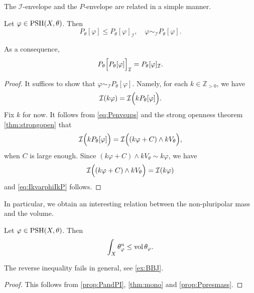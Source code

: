 The $\mathcal{I}$-envelope and the $P$-envelope are related in a simple manner.
\begin{proposition}\label{prop:PandPI}
    Let $\varphi\in \mathrm{PSH}(X,\theta)$. Then
    \[
        P_{\theta}[\varphi]\leq P_{\theta}[\varphi]_{\mathcal{I}},\quad \varphi \sim_{\mathcal{I}}P_{\theta}[\varphi].
    \]
\end{proposition}
As a consequence,
\begin{equation}\label{eq:PthetaIP_comp}
    P_{\theta}\Bigl[P_{\theta}[\varphi]\Bigr]_{\mathcal{I}}=P_{\theta}[\varphi]_{\mathcal{I}}.
\end{equation}
\begin{proof}
    It suffices to show that $\varphi\sim_{\mathcal{I}} P_{\theta}[\varphi]$. Namely, for each $k\in \mathbb{Z}_{>0}$, we have
    \begin{equation}\label{eq:IkvarphiIkP}
        \mathcal{I}(k\varphi)=\mathcal{I}\Bigl(kP_{\theta}[\varphi]\Bigr).
    \end{equation}
    Fix $k$ for now.
    It follows from \eqref{eq:Penvsups} and the strong openness theorem \cref{thm:strongopen} that
    \[
        \mathcal{I}\Bigl(kP_{\theta}[\varphi]\Bigr)=\mathcal{I}\Bigl((k\varphi+C)\land kV_{\theta}\Bigr),
    \]
    when $C$ is large enough. Since $(k\varphi+C)\land kV_{\theta}\sim k\varphi$, we have
    \[
        \mathcal{I}\Bigl((k\varphi+C)\land kV_{\theta}\Bigr)=\mathcal{I}(k\varphi)
    \]
    and \eqref{eq:IkvarphiIkP} follows.
\end{proof}

In particular, we obtain an interesting relation between the non-pluripolar mass and the volume.
\begin{corollary}\label{cor:compnppmassandvol}
    Let $\varphi\in \mathrm{PSH}(X,\theta)$. Then
    \[
        \int_X \theta_{\varphi}^n\leq \operatorname{vol} \theta_{\varphi}.
    \]
\end{corollary}
The reverse inequality fails in general, see \cref{ex:BBJ}.
\begin{proof}
    This follows from \cref{prop:PandPI}, \cref{thm:mono} and \cref{prop:Ppresmass}.
\end{proof}


